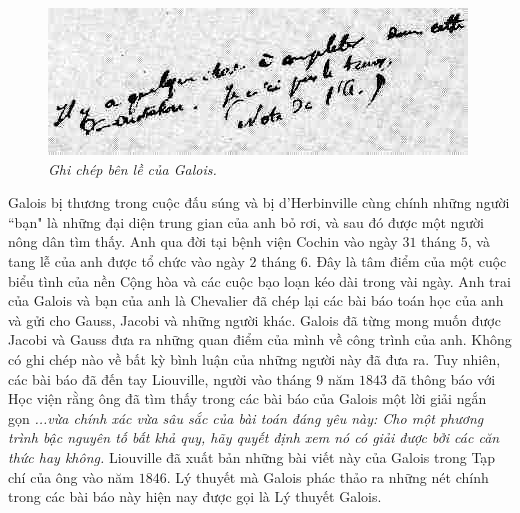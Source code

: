 \begin{multicols}{2}
	\begin{figure}[H]
		\vspace*{-5pt}
		\centering
		\captionsetup{labelformat= empty, justification=centering}
		\includegraphics[width= 1\linewidth]{4}
		\caption{\small\textit{\color{lichsutoanhoc}Ghi chép bên lề của Galois.}}
		\vspace*{-10pt}
	\end{figure}
	Galois bị thương trong cuộc đấu súng và bị d'Herbinville cùng chính những người ``bạn" là những đại diện trung gian của anh bỏ rơi, và sau đó được một người nông dân tìm thấy. Anh qua đời tại bệnh viện Cochin vào ngày $31$ tháng $5$, và tang lễ của anh được tổ chức vào ngày $2$ tháng $6$. Đây là tâm điểm của một cuộc biểu tình của nền Cộng hòa và các cuộc bạo loạn kéo dài trong vài ngày.
	\vskip 0.1cm
	Anh trai của Galois và bạn của anh là Chevalier đã chép lại các bài báo toán học của anh và gửi cho Gauss, Jacobi và những người khác. Galois đã từng mong muốn được Jacobi và Gauss đưa ra những quan điểm của mình về công trình của anh. Không có ghi chép nào về bất kỳ bình luận của những người này đã đưa ra. Tuy nhiên, các bài báo đã đến tay Liouville, người vào tháng $9$ năm $1843$ đã thông báo với Học viện rằng ông đã tìm thấy trong các bài báo của Galois một lời giải ngắn gọn
	\vskip 0.1cm	
	\textit{...vừa chính xác vừa sâu sắc của bài toán đáng yêu này: Cho một phương trình bậc nguyên tố bất khả quy, hãy quyết định xem nó có giải được bởi các căn thức hay không.}
	\vskip 0.1cm
	Liouville đã xuất bản những bài viết này của Galois trong Tạp chí của ông vào năm $1846$.
	\vskip 0.1cm
	Lý thuyết mà Galois phác thảo ra những nét chính trong các bài báo này hiện nay được gọi là Lý thuyết Galois.
\end{multicols}